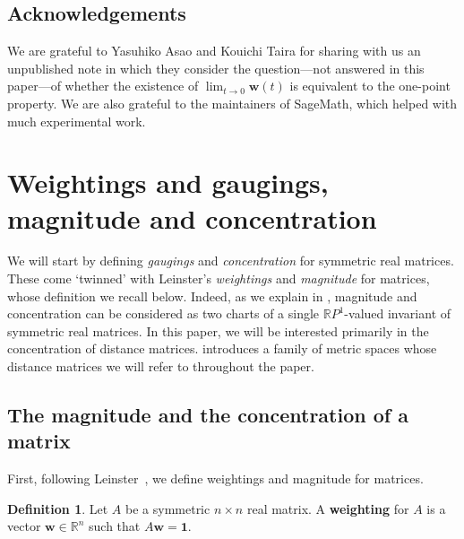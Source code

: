 \documentclass[a4paper, oneside, reqno]{amsart}
\theoremstyle{definition}
\newtheorem{definition}[theorem]{Definition}
\theoremstyle{remark}
\numberwithin{equation}{section}
\renewcommand{\vec}{\mathbf}
\newcommand{\onevector}{\mathbf{1}}
\newcommand{\R}{\mathbb{R}}
\newcommand{\define}{\textbf}
\begin{document}
\subsection*{Acknowledgements}

We are grateful to Yasuhiko Asao and Kouichi Taira for sharing with us an unpublished note in which they consider the question---not answered in this paper---of whether the existence of \(\lim_{t \to 0} \vec{w}(t)\) is equivalent to the one-point property. We are also grateful to the maintainers of SageMath, which helped with much experimental work.


\section{Weightings and gaugings, magnitude and concentration}
\label{sec:gaugings-concentration}

We will start by defining \emph{gaugings} and \emph{concentration} for symmetric real matrices. These come `twinned' with Leinster's \emph{weightings} and \emph{magnitude} for matrices, whose definition we recall below. Indeed, as we explain in , magnitude and concentration can be considered as two charts of a single \(\R P^1\)-valued invariant of symmetric real matrices. In this paper, we will be interested primarily in the concentration of distance matrices.  introduces a family of metric spaces whose distance matrices we will refer to throughout the paper.


\subsection{The magnitude and the concentration of a matrix}
\label{sec:concentration_of_matrices}

First, following Leinster~\cite{LeinsterMagnitude2013}, we define weightings and magnitude for matrices. 

\begin{definition}
\label{def:matrix_weighting}
    Let \(A\) be a symmetric \(n \times n\) real matrix. A \define{weighting} for \(A\) is a vector \(\vec{w} \in \R^n\) such that \(A \vec{w} = \onevector\).
\end{definition}
\end{document}
